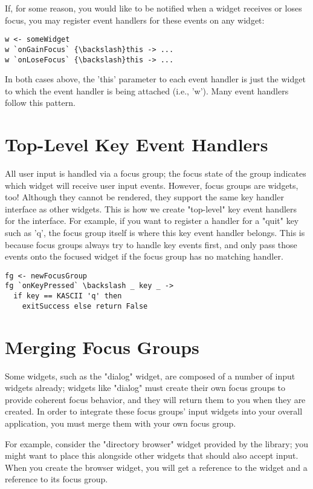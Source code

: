 \documentclass[11pt, letterpaper, oneside, titlepage]{article}
\begin{document}
If, for some reason, you would like to be notified when a widget
receives or loses focus, you may register event handlers for these
events on any widget:

\begin{verbatim}
w <- someWidget
w `onGainFocus` {\backslash}this -> ...
w `onLoseFocus` {\backslash}this -> ...
\end{verbatim}

In both cases above, the 'this' parameter to each event handler is just
the widget to which the event handler is being attached (i.e., 'w').
Many event handlers follow this pattern.

\section{Top-Level Key Event Handlers}

All user input is handled via a focus group; the focus state of the
group indicates which widget will receive user input events.  However,
focus groups are widgets, too!  Although they cannot be rendered, they
support the same key handler interface as other widgets.  This is how
we create "top-level" key event handlers for the interface.  For
example, if you want to register a handler for a "quit" key such as
'q', the focus group itself is where this key event handler belongs.
This is because focus groups always try to handle key events first,
and only pass those events onto the focused widget if the focus group
has no matching handler.

\begin{verbatim}
fg <- newFocusGroup
fg `onKeyPressed` \backslash _ key _ ->
  if key == KASCII 'q' then
    exitSuccess else return False
\end{verbatim}

\section{Merging Focus Groups}

Some widgets, such as the "dialog" widget, are composed of a number of
input widgets already; widgets like "dialog" must create their own
focus groups to provide coherent focus behavior, and they will return
them to you when they are created.  In order to integrate these focus
groups' input widgets into your overall application, you must merge
them with your own focus group.

For example, consider the "directory browser" widget provided by the
library; you might want to place this alongside other widgets that
should also accept input.  When you create the browser widget, you will
get a reference to the widget and a reference to its focus group.
\end{document}
